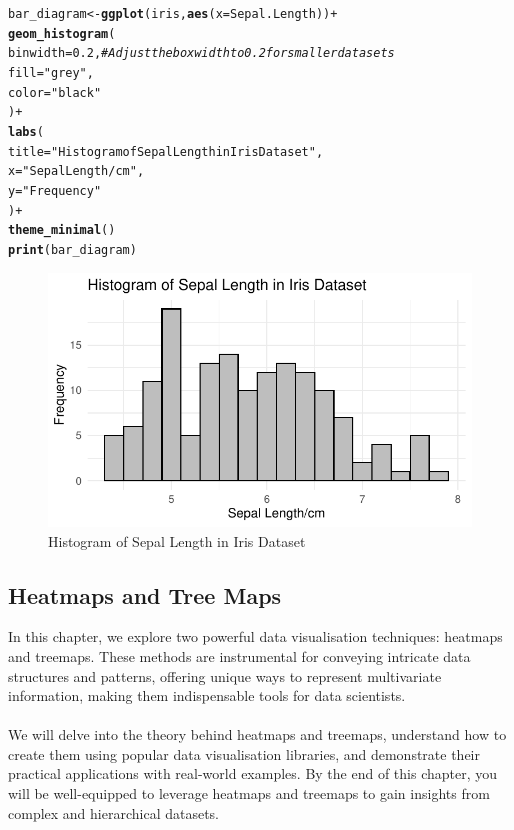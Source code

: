 \documentclass{article}\usepackage[]{graphicx}\usepackage[]{xcolor}
\makeatletter
\def\maxwidth{ %
  \ifdim\Gin@nat@width>\linewidth
    \linewidth
  \else
    \Gin@nat@width
  \fi
}
\newcommand{\hlnum}[1]{\textcolor[rgb]{0.686,0.059,0.569}{#1}}%
\newcommand{\hlstr}[1]{\textcolor[rgb]{0.192,0.494,0.8}{#1}}%
\newcommand{\hlcom}[1]{\textcolor[rgb]{0.678,0.584,0.686}{\textit{#1}}}%
\newcommand{\hlopt}[1]{\textcolor[rgb]{0,0,0}{#1}}%
\newcommand{\hlstd}[1]{\textcolor[rgb]{0.345,0.345,0.345}{#1}}%
\newcommand{\hlkwb}[1]{\textcolor[rgb]{0.69,0.353,0.396}{#1}}%
\newcommand{\hlkwc}[1]{\textcolor[rgb]{0.333,0.667,0.333}{#1}}%
\newcommand{\hlkwd}[1]{\textcolor[rgb]{0.737,0.353,0.396}{\textbf{#1}}}%
\newenvironment{kframe}{%
 \def\at@end@of@kframe{}%
 \ifinner\ifhmode%
  \def\at@end@of@kframe{\end{minipage}}%
  \begin{minipage}{\columnwidth}%
 \fi\fi%
 \def\FrameCommand##1{\hskip\@totalleftmargin \hskip-\fboxsep
 \colorbox{shadecolor}{##1}\hskip-\fboxsep
     \hskip-\linewidth \hskip-\@totalleftmargin \hskip\columnwidth}%
 \MakeFramed {\advance\hsize-\width
   \@totalleftmargin\z@ \linewidth\hsize
   \@setminipage}}%
 {\par\unskip\endMakeFramed%
 \at@end@of@kframe}
\newenvironment{knitrout}{}{} %
\makeatother
\begin{document}
\begin{knitrout}
\color{fgcolor}\begin{kframe}
\begin{alltt}
\hlstd{bar_diagram} \hlkwb{<-} \hlkwd{ggplot}\hlstd{(iris,} \hlkwd{aes}\hlstd{(}\hlkwc{x} \hlstd{= Sepal.Length))} \hlopt{+}
  \hlkwd{geom_histogram}\hlstd{(}
    \hlkwc{binwidth} \hlstd{=} \hlnum{0.2}\hlstd{,}  \hlcom{# Adjust the box width to 0.2 for smaller data sets}
    \hlkwc{fill} \hlstd{=} \hlstr{"grey"}\hlstd{,}
    \hlkwc{color} \hlstd{=} \hlstr{"black"}
  \hlstd{)} \hlopt{+}
  \hlkwd{labs}\hlstd{(}
    \hlkwc{title} \hlstd{=} \hlstr{"Histogram of Sepal Length in Iris Dataset"}\hlstd{,}
    \hlkwc{x} \hlstd{=} \hlstr{"Sepal Length/cm"}\hlstd{,}
    \hlkwc{y} \hlstd{=} \hlstr{"Frequency"}
  \hlstd{)} \hlopt{+}
  \hlkwd{theme_minimal}\hlstd{()}
\hlkwd{print}\hlstd{(bar_diagram)}
\end{alltt}
\end{kframe}\begin{figure}
\includegraphics[width=\maxwidth]{figure/hist3-1} \caption[Histogram of Sepal Length in Iris Dataset]{Histogram of Sepal Length in Iris Dataset}\label{fig:hist3}
\end{figure}

\end{knitrout}

\subsection{Heatmaps and Tree Maps}
In this chapter, we explore two powerful data visualisation techniques: heatmaps and treemaps. These methods are instrumental for conveying intricate data structures and patterns, offering unique ways to represent multivariate information, making them indispensable tools for data scientists.
\\  
\\We will delve into the theory behind heatmaps and treemaps, understand how to create them using popular data visualisation libraries, and demonstrate their practical applications with real-world examples. By the end of this chapter, you will be well-equipped to leverage heatmaps and treemaps to gain insights from complex and hierarchical datasets.
\end{document}
